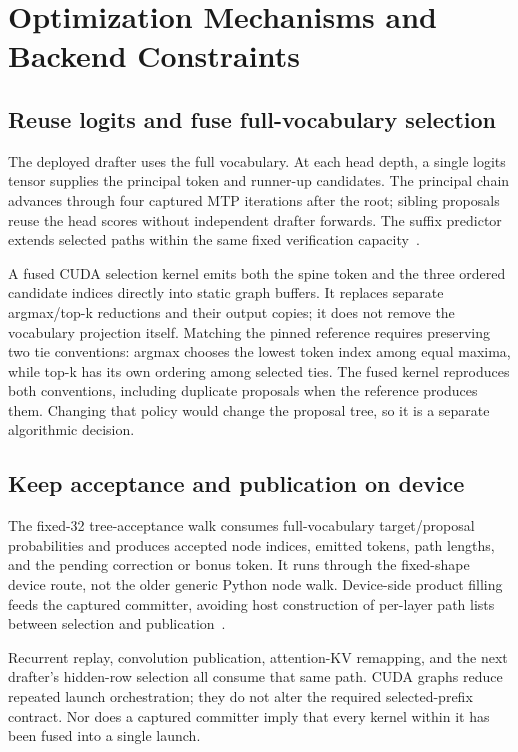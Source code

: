 \documentclass[conference]{IEEEtran}
\begin{document}
\section{Optimization Mechanisms and Backend Constraints}
\label{sec:optimization}
\subsection{Reuse logits and fuse full-vocabulary selection}
The deployed drafter uses the full vocabulary. At each head depth, a single logits tensor supplies the principal token and runner-up candidates. The principal chain advances through four captured MTP iterations after the root; sibling proposals reuse the head scores without independent drafter forwards. The suffix predictor extends selected paths within the same fixed verification capacity~\cite{lumo2026archive}.

A fused CUDA selection kernel emits both the spine token and the three ordered candidate indices directly into static graph buffers. It replaces separate argmax/top-k reductions and their output copies; it does not remove the vocabulary projection itself. Matching the pinned reference requires preserving two tie conventions: argmax chooses the lowest token index among equal maxima, while top-k has its own ordering among selected ties. The fused kernel reproduces both conventions, including duplicate proposals when the reference produces them. Changing that policy would change the proposal tree, so it is a separate algorithmic decision.

\subsection{Keep acceptance and publication on device}
The fixed-32 tree-acceptance walk consumes full-vocabulary target/proposal probabilities and produces accepted node indices, emitted tokens, path lengths, and the pending correction or bonus token. It runs through the fixed-shape device route, not the older generic Python node walk. Device-side product filling feeds the captured committer, avoiding host construction of per-layer path lists between selection and publication~\cite{lumo2026archive}.

Recurrent replay, convolution publication, attention-KV remapping, and the next drafter's hidden-row selection all consume that same path. CUDA graphs reduce repeated launch orchestration; they do not alter the required selected-prefix contract. Nor does a captured committer imply that every kernel within it has been fused into a single launch.
\end{document}
